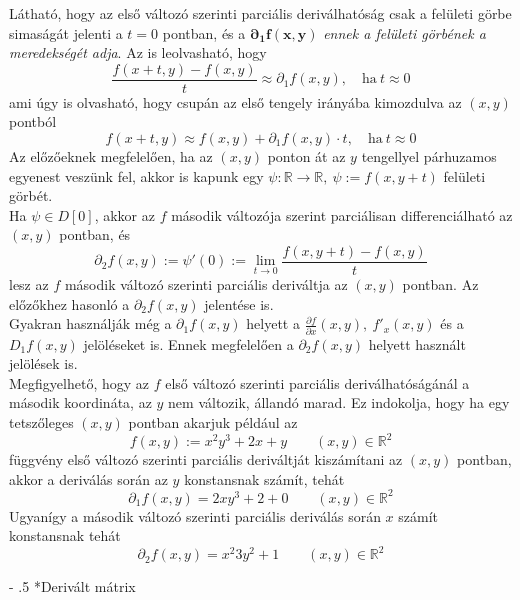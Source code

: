 \documentclass[12pt,margin=0px]{article}
\makeatletter
\newcommand\ddfrac[2]{\frac{\displaystyle #1}{\displaystyle #2}}
\renewcommand\paragraph{%
	\@startsection{paragraph}{4}{0mm}%
	{-\baselineskip}%
	{.5\baselineskip}%
	{\normalfont\normalsize\bfseries}}
\makeatother
\begin{document}
    \noindent Látható, hogy az első változó szerinti parciális deriválhatóság csak a felületi görbe simaságát jelenti a $t = 0$ pontban, és a $\boldsymbol{\partial_{1}f(x, y)}$ \emph{ennek a felületi görbének a meredekségét adja}. Az is leolvasható, hogy
    \[
        \ddfrac{f(x + t, y) - f(x,y)}{t} \approx \partial_1 f(x,y),\quad \text{ha}\ t \approx 0
    \]
    ami úgy is olvasható, hogy csupán az első tengely irányába kimozdulva az $(x, y)$ pontból
    \[
        f(x + t, y) \approx f(x,y) + \partial_{1}f (x, y) \cdot t,\quad \text{ha}\ t \approx 0
    \]
    Az előzőeknek megfelelően, ha az $(x, y)$ ponton át az $y$ tengellyel párhuzamos egyenest veszünk fel, akkor is kapunk egy $\psi : \mathbb{R} \to \mathbb{R},\ \psi := f(x, y + t)$  felületi görbét.\\

    \noindent Ha $\psi \in D[0]$, akkor az $f$ második változója szerint parciálisan differenciálható az $(x, y)$ pontban, és
    \[
        \partial_2 f(x, y) := \psi'(0) := \lim\limits_{t \to 0} \ddfrac{f(x, y + t) - f(x, y)}{t}
    \]
    lesz az $f$ második változó szerinti parciális deriváltja az $(x,y)$ pontban. Az előzőkhez hasonló a $\partial_2 f(x, y)$ jelentése is.\\

    \noindent Gyakran használják még a $\partial_1 f(x, y)$ helyett a $\ddfrac{\partial{f}}{\partial{x}}(x, y),\ f'_{x}(x, y)$ és a $D_1 f(x, y)$ jelöléseket is. Ennek megfelelően a $\partial_2 f(x, y)$ helyett használt jelölések is.\\

    \noindent Megfigyelhető, hogy az $f$ első változó szerinti parciális deriválhatóságánál a második koordináta, az $y$ nem változik, állandó marad. Ez indokolja, hogy ha egy tetszőleges $(x, y)$ pontban akarjuk például az
     \[
        f(x,y) := x^2y^3 + 2x + y   \qquad (x,y) \in \mathbb{R}^2
     \]
     függvény első változó szerinti parciális deriváltját kiszámítani az $(x,y)$ pontban, akkor a deriválás során az $y$ konstansnak számít, tehát
     \[
        \partial_1 f(x,y) = 2xy^3 + 2 + 0   \qquad (x,y) \in \mathbb{R}^2
     \]
     Ugyanígy a második változó szerinti parciális deriválás során $x$ számít konstansnak tehát
     \[
        \partial_2 f(x, y) = x^{2}3y^{2} + 1   \qquad (x,y) \in \mathbb{R}^2
     \]

     \paragraph*{Derivált mátrix}
\end{document}

